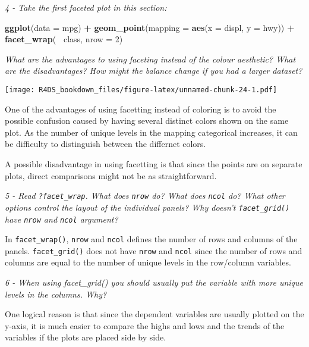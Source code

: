 \documentclass[]{article}
\newenvironment{Shaded}{\begin{snugshade}}{\end{snugshade}}
\newcommand{\KeywordTok}[1]{\textcolor[rgb]{0.13,0.29,0.53}{\textbf{#1}}}
\newcommand{\DataTypeTok}[1]{\textcolor[rgb]{0.13,0.29,0.53}{#1}}
\newcommand{\DecValTok}[1]{\textcolor[rgb]{0.00,0.00,0.81}{#1}}
\newcommand{\StringTok}[1]{\textcolor[rgb]{0.31,0.60,0.02}{#1}}
\newcommand{\OperatorTok}[1]{\textcolor[rgb]{0.81,0.36,0.00}{\textbf{#1}}}
\newcommand{\NormalTok}[1]{#1}
\theoremstyle{definition}
\theoremstyle{definition}
\theoremstyle{definition}
\theoremstyle{remark}
\begin{document}
\emph{4 - Take the first faceted plot in this section:}

\begin{Shaded}
\begin{Highlighting}[]
\KeywordTok{ggplot}\NormalTok{(}\DataTypeTok{data =}\NormalTok{ mpg) }\OperatorTok{+}\StringTok{ }
\StringTok{  }\KeywordTok{geom_point}\NormalTok{(}\DataTypeTok{mapping =} \KeywordTok{aes}\NormalTok{(}\DataTypeTok{x =}\NormalTok{ displ, }\DataTypeTok{y =}\NormalTok{ hwy)) }\OperatorTok{+}\StringTok{ }
\StringTok{  }\KeywordTok{facet_wrap}\NormalTok{(}\OperatorTok{~}\StringTok{ }\NormalTok{class, }\DataTypeTok{nrow =} \DecValTok{2}\NormalTok{)}
\end{Highlighting}
\end{Shaded}

\emph{What are the advantages to using faceting instead of the colour
aesthetic? What are the disadvantages? How might the balance change if
you had a larger dataset?}

\texttt{[image: R4DS\_bookdown\_files/figure-latex/unnamed-chunk-24-1.pdf]}

One of the advantages of using facetting instead of coloring is to avoid
the possible confusion caused by having several distinct colors shown on
the same plot. As the number of unique levels in the mapping categorical
increases, it can be difficulty to distinguish between the differnet
colors.

A possible disadvantage in using facetting is that since the points are
on separate plots, direct comparisons might not be as straightforward.

\emph{5 - Read \texttt{?facet\_wrap}. What does \texttt{nrow} do? What
does \texttt{ncol} do? What other options control the layout of the
individual panels? Why doesn't \texttt{facet\_grid()} have \texttt{nrow}
and \texttt{ncol} argument?}

In \texttt{facet\_wrap()}, \texttt{nrow} and \texttt{ncol} defines the
number of rows and columns of the panels. \texttt{facet\_grid()} does
not have \texttt{nrow} and \texttt{ncol} since the number of rows and
columns are equal to the number of unique levels in the row/column
variables.

\emph{6 - When using facet\_grid() you should usually put the variable
with more unique levels in the columns. Why?}

One logical reason is that since the dependent variables are usually
plotted on the y-axis, it is much easier to compare the highs and lows
and the trends of the variables if the plots are placed side by side.
\end{document}

